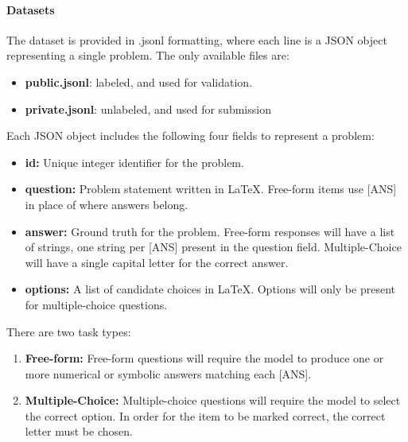 \documentclass{article}
\begin{document}
\paragraph{Datasets}
The dataset is provided in .jsonl formatting, where each line is a JSON object representing a single problem. The only available files are:
\begin{itemize}
    \item \textbf{public.jsonl}: labeled, and used for validation.
    \item \textbf{private.jsonl}: unlabeled, and used for submission
\end{itemize}
Each JSON object includes the following four fields to represent a problem:
\begin{itemize}
    \item \textbf{id:} Unique integer identifier for the problem.
    \item \textbf{question:} Problem statement written in LaTeX. Free-form items use [ANS] in place of where answers belong.
    \item \textbf{answer:} Ground truth for the problem. Free-form responses will have a list of strings, one string per [ANS] present in the question field. Multiple-Choice will have a single capital letter for the correct answer.
    \item \textbf{options:} A list of candidate choices in LaTeX. Options will only be present for multiple-choice questions. 
\end{itemize}

There are two task types:
\begin{enumerate}
    \item \textbf{Free-form:} Free-form questions will require the model to produce one or more numerical or symbolic answers matching each [ANS]. 
    \item \textbf{Multiple-Choice:} Multiple-choice questions will require the model to select the correct option. In order for the item to be marked correct, the correct letter must be chosen.
\end{enumerate}
\end{document}
